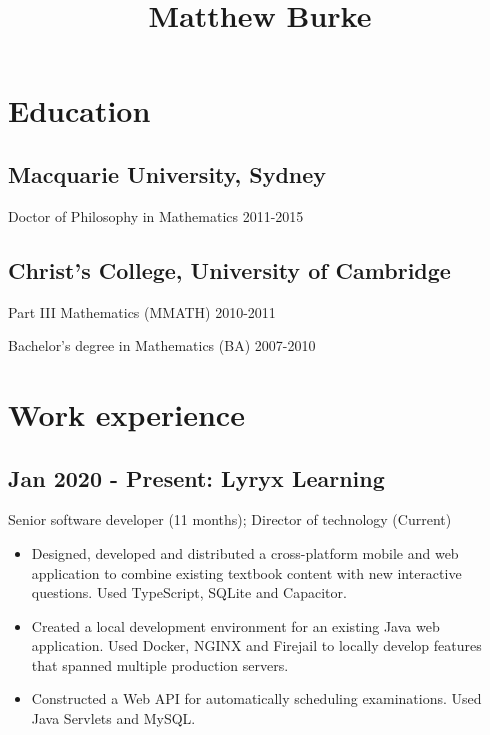 \documentclass[11pt]{article}
\date{}
\date{}
\title{Matthew Burke}
\begin{document}
\maketitle

\section*{Education}
\label{sec:orgade414e}

\subsection*{Macquarie University, Sydney}
\label{sec:org83524fe}

Doctor of Philosophy in Mathematics 2011-2015

\subsection*{Christ's College, University of Cambridge}
\label{sec:org48c3d00}

Part III Mathematics (MMATH) 2010-2011

Bachelor's degree in Mathematics (BA) 2007-2010 

\section*{Work experience}
\label{sec:org922ceea}

\subsection*{Jan 2020 - Present: Lyryx Learning}
\label{sec:orgaa09e48}

Senior software developer (11 months); Director of technology (Current)

\begin{itemize}
\item Designed, developed and distributed a cross-platform mobile and web application to combine existing textbook content with new interactive questions. Used TypeScript, SQLite and Capacitor.
\item Created a local development environment for an existing Java web application. Used Docker, NGINX and Firejail to locally develop features that spanned multiple production servers.
\item Constructed a Web API for automatically scheduling examinations. Used Java Servlets and MySQL.
\end{itemize}
\end{document}
